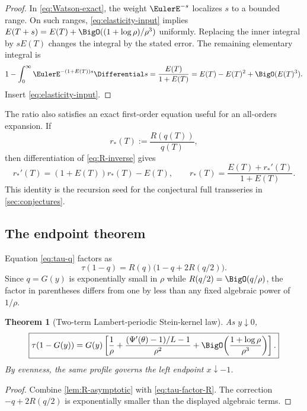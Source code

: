 \documentclass[11pt,a4paper]{article}
\newtheorem{theorem}{Theorem}[section]
\theoremstyle{definition}
\theoremstyle{remark}
\begin{document}
\begin{proof}
In \eqref{eq:Watson-exact}, the weight $\EulerE^{-s}$ localizes $s$ to a bounded range. On such ranges, \eqref{eq:elasticity-input} implies
$E(T+s)=E(T)+\BigO((1+\log\rho)/\rho^3)$ uniformly. Replacing the inner integral by $sE(T)$ changes the integral by the stated error. The remaining elementary integral is
\[
 1-\int_0^\infty\EulerE^{-(1+E(T))s}\Differential s
 =\frac{E(T)}{1+E(T)}
 =E(T)-E(T)^2+\BigO(E(T)^3).
\]
Insert \eqref{eq:elasticity-input}.
\end{proof}

The ratio also satisfies an exact first-order equation useful for an all-orders expansion. If
\begin{equation}
 r_*(T):=\frac{R(q(T))}{q(T)},
 \label{eq:rstar}
\end{equation}
then differentiation of \eqref{eq:R-inverse} gives
\begin{equation}
 r_*'(T)=(1+E(T))r_*(T)-E(T),
 \qquad
 r_*(T)=\frac{E(T)+r_*'(T)}{1+E(T)}.
 \label{eq:rstar-ode}
\end{equation}
This identity is the recursion seed for the conjectural full transseries in \cref{sec:conjectures}.

\subsection{The endpoint theorem}

Equation \eqref{eq:tau-q} factors as
\begin{equation}
 \tau(1-q)=R(q)\bigl(1-q+2R(q/2)\bigr).
 \label{eq:tau-factor-R}
\end{equation}
Since $q=G(y)$ is exponentially small in $\rho$ while $R(q/2)=\BigO(q/\rho)$, the factor in parentheses differs from one by less than any fixed algebraic power of $1/\rho$.

\begin{theorem}[Two-term Lambert-periodic Stein-kernel law]
\label{thm:tau-endpoint}
As $y\downarrow0$,
\begin{equation}
 \boxed{\displaystyle
 \tau(1-G(y))=G(y)\left[
 \frac1\rho+
 \frac{(\Psi'(\theta)-1)/L-1}{\rho^2}
 +\BigO\!\left(\frac{1+\log\rho}{\rho^3}\right)
 \right].}
 \label{eq:tau-endpoint}
\end{equation}
By evenness, the same profile governs the left endpoint $x\downarrow-1$.
\end{theorem}

\begin{proof}
Combine \cref{lem:R-asymptotic} with \eqref{eq:tau-factor-R}. The correction $-q+2R(q/2)$ is exponentially smaller than the displayed algebraic terms.
\end{proof}
\end{document}
